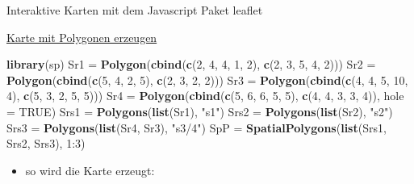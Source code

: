 \documentclass[ignorenonframetext,]{beamer}
\newenvironment{Shaded}{}{}
\newcommand{\KeywordTok}[1]{\textcolor[rgb]{0.00,0.44,0.13}{\textbf{{#1}}}}
\newcommand{\DataTypeTok}[1]{\textcolor[rgb]{0.56,0.13,0.00}{{#1}}}
\newcommand{\DecValTok}[1]{\textcolor[rgb]{0.25,0.63,0.44}{{#1}}}
\newcommand{\StringTok}[1]{\textcolor[rgb]{0.25,0.44,0.63}{{#1}}}
\newcommand{\OtherTok}[1]{\textcolor[rgb]{0.00,0.44,0.13}{{#1}}}
\newcommand{\NormalTok}[1]{{#1}}
\providecommand{\tightlist}{%
\setlength{\itemsep}{0pt}\setlength{\parskip}{0pt}}
\begin{document}
\begin{frame}[fragile]{Interaktive Karten mit dem Javascript Paket
leaflet}
\begin{block}{\href{https://rstudio.github.io/leaflet/map_widget.html}{Karte
mit Polygonen erzeugen}}
\begin{Shaded}
\begin{Highlighting}[]
\KeywordTok{library}\NormalTok{(sp)}
\NormalTok{Sr1 =}\StringTok{ }\KeywordTok{Polygon}\NormalTok{(}\KeywordTok{cbind}\NormalTok{(}\KeywordTok{c}\NormalTok{(}\DecValTok{2}\NormalTok{, }\DecValTok{4}\NormalTok{, }\DecValTok{4}\NormalTok{, }\DecValTok{1}\NormalTok{, }\DecValTok{2}\NormalTok{), }\KeywordTok{c}\NormalTok{(}\DecValTok{2}\NormalTok{, }\DecValTok{3}\NormalTok{, }\DecValTok{5}\NormalTok{, }\DecValTok{4}\NormalTok{, }\DecValTok{2}\NormalTok{)))}
\NormalTok{Sr2 =}\StringTok{ }\KeywordTok{Polygon}\NormalTok{(}\KeywordTok{cbind}\NormalTok{(}\KeywordTok{c}\NormalTok{(}\DecValTok{5}\NormalTok{, }\DecValTok{4}\NormalTok{, }\DecValTok{2}\NormalTok{, }\DecValTok{5}\NormalTok{), }\KeywordTok{c}\NormalTok{(}\DecValTok{2}\NormalTok{, }\DecValTok{3}\NormalTok{, }\DecValTok{2}\NormalTok{, }\DecValTok{2}\NormalTok{)))}
\NormalTok{Sr3 =}\StringTok{ }\KeywordTok{Polygon}\NormalTok{(}\KeywordTok{cbind}\NormalTok{(}\KeywordTok{c}\NormalTok{(}\DecValTok{4}\NormalTok{, }\DecValTok{4}\NormalTok{, }\DecValTok{5}\NormalTok{, }\DecValTok{10}\NormalTok{, }\DecValTok{4}\NormalTok{), }\KeywordTok{c}\NormalTok{(}\DecValTok{5}\NormalTok{, }\DecValTok{3}\NormalTok{, }\DecValTok{2}\NormalTok{, }\DecValTok{5}\NormalTok{, }\DecValTok{5}\NormalTok{)))}
\NormalTok{Sr4 =}\StringTok{ }\KeywordTok{Polygon}\NormalTok{(}\KeywordTok{cbind}\NormalTok{(}\KeywordTok{c}\NormalTok{(}\DecValTok{5}\NormalTok{, }\DecValTok{6}\NormalTok{, }\DecValTok{6}\NormalTok{, }\DecValTok{5}\NormalTok{, }\DecValTok{5}\NormalTok{), }\KeywordTok{c}\NormalTok{(}\DecValTok{4}\NormalTok{, }\DecValTok{4}\NormalTok{, }\DecValTok{3}\NormalTok{, }\DecValTok{3}\NormalTok{, }\DecValTok{4}\NormalTok{)), }\DataTypeTok{hole =} \OtherTok{TRUE}\NormalTok{)}
\NormalTok{Srs1 =}\StringTok{ }\KeywordTok{Polygons}\NormalTok{(}\KeywordTok{list}\NormalTok{(Sr1), }\StringTok{"s1"}\NormalTok{)}
\NormalTok{Srs2 =}\StringTok{ }\KeywordTok{Polygons}\NormalTok{(}\KeywordTok{list}\NormalTok{(Sr2), }\StringTok{"s2"}\NormalTok{)}
\NormalTok{Srs3 =}\StringTok{ }\KeywordTok{Polygons}\NormalTok{(}\KeywordTok{list}\NormalTok{(Sr4, Sr3), }\StringTok{"s3/4"}\NormalTok{)}
\NormalTok{SpP =}\StringTok{ }\KeywordTok{SpatialPolygons}\NormalTok{(}\KeywordTok{list}\NormalTok{(Srs1, Srs2, Srs3), }\DecValTok{1}\NormalTok{:}\DecValTok{3}\NormalTok{)}
\end{Highlighting}
\end{Shaded}

\begin{itemize}
\tightlist
\item
  so wird die Karte erzeugt:
\end{itemize}


\end{block}
\end{frame}
\end{document}

